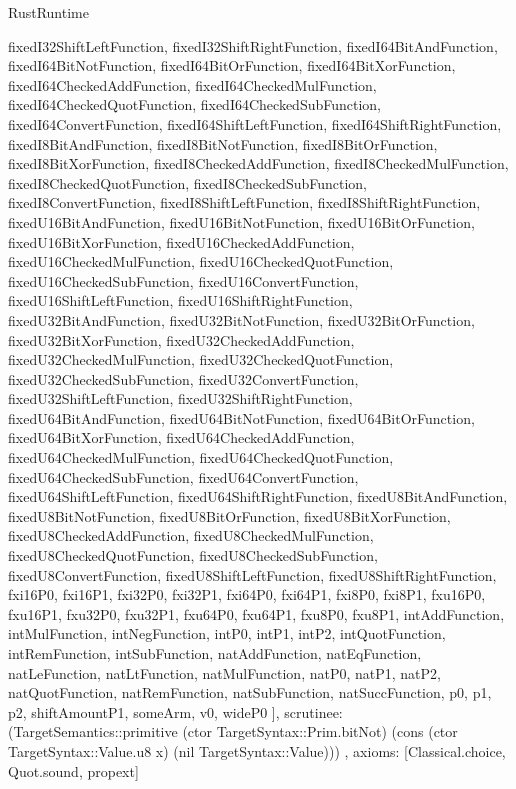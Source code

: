 \begin{lexlean}{RustRuntime}
\begin{semanticmodule}
{{      fixedI32ShiftLeftFunction,
      fixedI32ShiftRightFunction,
      fixedI64BitAndFunction,
      fixedI64BitNotFunction,
      fixedI64BitOrFunction,
      fixedI64BitXorFunction,
      fixedI64CheckedAddFunction,
      fixedI64CheckedMulFunction,
      fixedI64CheckedQuotFunction,
      fixedI64CheckedSubFunction,
      fixedI64ConvertFunction,
      fixedI64ShiftLeftFunction,
      fixedI64ShiftRightFunction,
      fixedI8BitAndFunction,
      fixedI8BitNotFunction,
      fixedI8BitOrFunction,
      fixedI8BitXorFunction,
      fixedI8CheckedAddFunction,
      fixedI8CheckedMulFunction,
      fixedI8CheckedQuotFunction,
      fixedI8CheckedSubFunction,
      fixedI8ConvertFunction,
      fixedI8ShiftLeftFunction,
      fixedI8ShiftRightFunction,
      fixedU16BitAndFunction,
      fixedU16BitNotFunction,
      fixedU16BitOrFunction,
      fixedU16BitXorFunction,
      fixedU16CheckedAddFunction,
      fixedU16CheckedMulFunction,
      fixedU16CheckedQuotFunction,
      fixedU16CheckedSubFunction,
      fixedU16ConvertFunction,
      fixedU16ShiftLeftFunction,
      fixedU16ShiftRightFunction,
      fixedU32BitAndFunction,
      fixedU32BitNotFunction,
      fixedU32BitOrFunction,
      fixedU32BitXorFunction,
      fixedU32CheckedAddFunction,
      fixedU32CheckedMulFunction,
      fixedU32CheckedQuotFunction,
      fixedU32CheckedSubFunction,
      fixedU32ConvertFunction,
      fixedU32ShiftLeftFunction,
      fixedU32ShiftRightFunction,
      fixedU64BitAndFunction,
      fixedU64BitNotFunction,
      fixedU64BitOrFunction,
      fixedU64BitXorFunction,
      fixedU64CheckedAddFunction,
      fixedU64CheckedMulFunction,
      fixedU64CheckedQuotFunction,
      fixedU64CheckedSubFunction,
      fixedU64ConvertFunction,
      fixedU64ShiftLeftFunction,
      fixedU64ShiftRightFunction,
      fixedU8BitAndFunction,
      fixedU8BitNotFunction,
      fixedU8BitOrFunction,
      fixedU8BitXorFunction,
      fixedU8CheckedAddFunction,
      fixedU8CheckedMulFunction,
      fixedU8CheckedQuotFunction,
      fixedU8CheckedSubFunction,
      fixedU8ConvertFunction,
      fixedU8ShiftLeftFunction,
      fixedU8ShiftRightFunction,
      fxi16P0,
      fxi16P1,
      fxi32P0,
      fxi32P1,
      fxi64P0,
      fxi64P1,
      fxi8P0,
      fxi8P1,
      fxu16P0,
      fxu16P1,
      fxu32P0,
      fxu32P1,
      fxu64P0,
      fxu64P1,
      fxu8P0,
      fxu8P1,
      intAddFunction,
      intMulFunction,
      intNegFunction,
      intP0,
      intP1,
      intP2,
      intQuotFunction,
      intRemFunction,
      intSubFunction,
      natAddFunction,
      natEqFunction,
      natLeFunction,
      natLtFunction,
      natMulFunction,
      natP0,
      natP1,
      natP2,
      natQuotFunction,
      natRemFunction,
      natSubFunction,
      natSuccFunction,
      p0,
      p1,
      p2,
      shiftAmountP1,
      someArm,
      v0,
      wideP0
    ],
    scrutinee: (TargetSemantics::primitive (ctor TargetSyntax::Prim.bitNot) (cons (ctor TargetSyntax::Value.u8 x) (nil TargetSyntax::Value)))
  },
  axioms: [Classical.choice, Quot.sound, propext]
}


\end{semanticmodule}
\end{lexlean}
